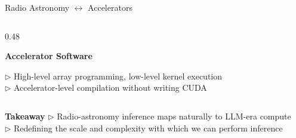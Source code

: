 \documentclass{beamer}
\newcommand{\bayesgridblock}[3][1.72cm]{%
  \begin{beamerboxesrounded}[upper=block title,lower=block body,shadow=true,width=\linewidth]{\textbf{#2}}
    \small
    \parbox[t][#1][t]{0.94\linewidth}{\raggedright #3\par}
  \end{beamerboxesrounded}
}
\begin{document}
\begin{frame}{Radio Astronomy $\leftrightarrow$ Accelerators}
\begin{columns}[T,totalwidth=\textwidth]
\begin{column}{0.48\textwidth}
\vspace{0.05em}
{
\bayesgridblock[1.70cm]{Accelerator Software}{%
\(\triangleright\) High-level array programming, low-level kernel execution\\[0.18em]
\(\triangleright\) Accelerator-level compilation without writing CUDA\\[0.18em]

}
}
\end{column}
\end{columns}

\vspace{-0.01em}
{
\begin{beamerboxesrounded}[upper=block title,lower=block body,shadow=true,width=\textwidth]{\textbf{Takeaway}}
\small
\(\triangleright\) Radio-astronomy inference maps naturally to LLM-era compute\\[0.15em]
\(\triangleright\) Redefining the scale and complexity with which we can perform inference
\end{beamerboxesrounded}
}
\end{frame}
\end{document}
